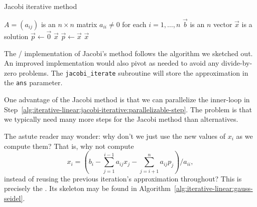 \begin{algorithm}\label{alg:iterative-linear:jacobi-iterative}
  \caption{Jacobi iterative method}
  \begin{algorithmic}[1]
    \Require $A=(a_{ij})$ is an $n\times n$ matrix
    \Require $a_{ii}\neq0$ for each $i=1,\dots,n$
    \Require $\vec{b}$ is an $n$ vector
    \Ensure $\vec{x}$ is a solution
    \State $\vec{p}\gets\vec{0}$ 
      \label{alg:iterative-linear:jacobi-iterative:parallelizable-step}
      \EndFor
        \State\Return $\vec{x}$
      \EndIf
      \State $\vec{p}\gets\vec{x}$
    \EndFor
    \State\Return $\vec{x}$
  \EndFunction
\end{algorithmic}
\end{algorithm}

\begin{chunk}
  The \FORTRAN/ implementation of Jacobi's method follows the algorithm
  we sketched out. An improved
  implementation would also pivot as needed to avoid any divide-by-zero
  problems. The
  \verb#jacobi_iterate# subroutine will store the approximation in the
  \verb#ans# parameter.
  
\end{chunk}

One advantage of the Jacobi method is that we can parallelize the
inner-loop in
Step~\ref{alg:iterative-linear:jacobi-iterative:parallelizable-step}. The
problem is that we typically need many more steps for the Jacobi method
than alternatives.

The astute reader may wonder: why don't we just use the new values of
$x_{i}$ as we compute them? That is, why not compute
\begin{equation}
x_{i}=(b_{i}-\sum^{i-1}_{j=1}a_{ij}x_{j}-\sum^{n}_{j=i+1}a_{ij}p_{j})/a_{ii},
\end{equation}
instead of reusing the previous iteration's approximation throughout?
This is precisely the . Its skeleton may be
found in Algorithm~\ref{alg:iterative-linear:gauss-seidel}.

